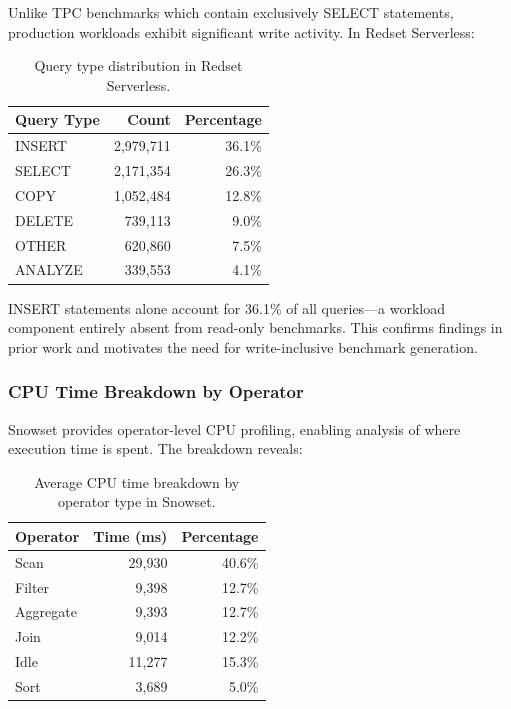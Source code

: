 \documentclass[12pt]{report}
\begin{document}
Unlike TPC benchmarks which contain exclusively SELECT statements, production workloads exhibit significant write activity. In Redset Serverless:

\begin{table}[H]
    \centering
    \caption{Query type distribution in Redset Serverless.}
    \label{tab:query-types}
    \begin{tabular}{lrr}
        \toprule
        Query Type & Count & Percentage \\
        \midrule
        INSERT & 2,979,711 & 36.1\% \\
        SELECT & 2,171,354 & 26.3\% \\
        COPY & 1,052,484 & 12.8\% \\
        DELETE & 739,113 & 9.0\% \\
        OTHER & 620,860 & 7.5\% \\
        ANALYZE & 339,553 & 4.1\% \\
        \bottomrule
    \end{tabular}
\end{table}

INSERT statements alone account for 36.1\% of all queries---a workload component entirely absent from read-only benchmarks. This confirms findings in prior work \cite{redset} and motivates the need for write-inclusive benchmark generation.

\subsubsection{CPU Time Breakdown by Operator}

Snowset provides operator-level CPU profiling, enabling analysis of where execution time is spent. The breakdown reveals:

\begin{table}[H]
    \centering
    \caption{Average CPU time breakdown by operator type in Snowset.}
    \label{tab:cpu-breakdown}
    \begin{tabular}{lrr}
        \toprule
        Operator & Time (ms) & Percentage \\
        \midrule
        Scan & 29,930 & 40.6\% \\
        Filter & 9,398 & 12.7\% \\
        Aggregate & 9,393 & 12.7\% \\
        Join & 9,014 & 12.2\% \\
        Idle & 11,277 & 15.3\% \\
        Sort & 3,689 & 5.0\% \\
        \bottomrule
    \end{tabular}
\end{table}
\end{document}

